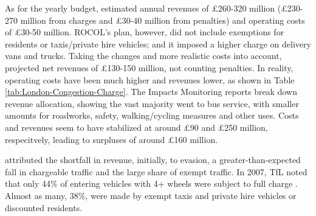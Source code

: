 As for the yearly budget, \citet{ROCOL2000} estimated annual revenues of \pounds 260-320 million (\pounds 230-270 million from charges and \pounds 30-40 million from penalties) and operating costs of \pounds 30-50 million. ROCOL's plan, however, did not include exemptions for residents or taxis/private hire vehicles; and it imposed a higher charge on delivery vans and trucks. Taking the changes and more realistic costs into account, \citet{TfL2002} projected net revenues of \pounds 130-150 million, not counting penalties. In reality, operating costs have been much higher and revenues lower, as shown in Table \ref{tab:London-Congestion-Charge}. The Impacts Monitoring reports break down revenue allocation, showing the vast majority went to bus service, with smaller amounts for roadworks, safety, walking/cycling measures and other uses. Costs and revenues seem to have stabilized at around \pounds 90 and \pounds 250 million, respecitvely, leading to surpluses of around \pounds 160 million.

\citet[p. 186]{TfL2003b} attributed the shortfall in revenue, initially, to evasion, a greater-than-expected fall in chargeable traffic and the large share of exempt traffic. In 2007, TfL noted that only 44\% of entering vehicles with 4+ wheels were subject to full charge \citep[p. 12]{TfLExPost2007}. Almost as many, 38\%, were made by exempt taxis and private hire vehicles or discounted residents. 

